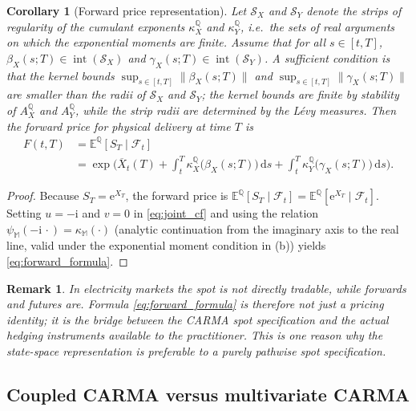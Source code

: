 \documentclass[10pt,a4paper,reqno]{amsart}
\newtheorem{corollary}[theorem]{Corollary}
\newtheorem{remark}[theorem]{Remark}
\newcommand{\E}{\mathbb{E}}
\newcommand{\Q}{\mathbb{Q}}
\newcommand{\F}{\mathcal{F}}
\newcommand{\1}{\mathbbm{1}}
\newcommand{\dd}{\mathrm{d}}
\newcommand{\ii}{\mathrm{i}}
\newcommand{\ee}{\mathrm{e}}
\begin{document}
\begin{corollary}[Forward price representation]
\label{cor:forward_price}
Let \(\mathcal{S}_X\) and \(\mathcal{S}_Y\) denote the strips of regularity of
the cumulant exponents \(\kappa_X^\Q\) and \(\kappa_Y^\Q\), i.e.\ the sets of
real arguments on which the exponential moments are finite. Assume that for
all \(s \in [t,T]\), \(\beta_X(s;T) \in \operatorname{int}(\mathcal{S}_X)\)
and \(\gamma_X(s;T) \in \operatorname{int}(\mathcal{S}_Y)\). A sufficient
condition is that the kernel bounds
\(\sup_{s \in [t,T]}\|\beta_X(s;T)\|\) and
\(\sup_{s \in [t,T]}\|\gamma_X(s;T)\|\) are smaller than the radii of
\(\mathcal{S}_X\) and \(\mathcal{S}_Y\); the kernel bounds are finite by
stability of \(A_X^\Q\) and \(A_Y^\Q\), while the strip radii are determined
by the Lévy measures.
Then the forward price for physical delivery at time \(T\) is
\begin{align}
  F(t,T)
  &= \E^\Q[S_T \mid \F_t] \nonumber\\
  &= \exp\Bigg(
      \overline{X}_t(T)
      + \int_t^T \kappa_X^\Q\!\big(\beta_X(s;T)\big)\,\dd s
      + \int_t^T \kappa_Y^\Q\!\big(\gamma_X(s;T)\big)\,\dd s
    \Bigg).
    \label{eq:forward_formula}
\end{align}
\end{corollary}

\begin{proof}
Because \(S_T = \ee^{X_T}\), the forward price is
\(\E^\Q[S_T\mid\F_t] = \E^\Q[\ee^{X_T}\mid\F_t]\).
Setting \(u = -\ii\) and \(v = 0\) in \eqref{eq:joint_cf} and using the
relation \(\psi_{\mathbb{M}}(-\ii\,\cdot) = \kappa_{\mathbb{M}}(\cdot)\)
(analytic continuation from the imaginary axis to the real line, valid under
the exponential moment condition in (b)) yields
\eqref{eq:forward_formula}.
\end{proof}

\begin{remark}
In electricity markets the spot is not directly tradable, while forwards and
futures are. Formula \eqref{eq:forward_formula} is therefore not just a pricing
identity; it is the bridge between the CARMA spot specification and the actual
hedging instruments available to the practitioner. This is one reason why the
state-space representation is preferable to a purely pathwise spot specification.
\end{remark}

\subsection{Coupled CARMA versus multivariate CARMA}
\end{document}
